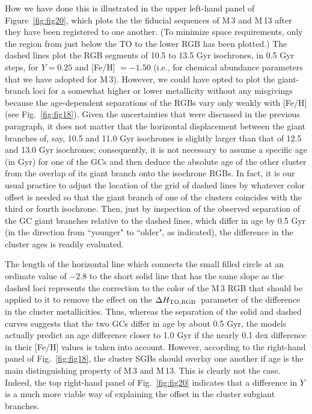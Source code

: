 \documentclass[12pt,preprint]{aastex}
\newcommand\delc{\Delta H_{\rm TO,RGB}}
\begin{document}
How we have done this is illustrated in the upper left-hand panel of
Figure~\ref{fig:fig20}, which plots the the fiducial sequences of M$\,$3 and
M$\,$13 after they have been registered to one another.  (To minimize space
requirements, only the region from just below the TO to the lower RGB has been
plotted.)  The dashed lines plot the RGB segments of 10.5 to 13.5 Gyr 
isochrones, in 0.5 Gyr steps, for $Y = 0.25$ and [Fe/H] $= -1.50$ (i.e., for
chemical abundance parameters that we have adopted for M$\,$3).  However, we
could have opted to plot the giant-branch loci for a somewhat higher or lower
metallicity without any misgivings because the age-dependent separations of the
RGBs vary only weakly with [Fe/H] (see Fig.~\ref{fig:fig18}).  Given the
uncertainties that were discussed in the previous paragraph, it does not matter
that the horizontal displacement between the giant branches of, say, 10.5 and
11.0 Gyr isochrones is slightly larger than that of 12.5 and 13.0 Gyr
isochrones; consequently, it is not necessary to assume a specific age (in Gyr)
for one of the GCs and then deduce the absolute age of the other cluster from
the overlap of its giant branch onto the isochrone RGBs.  In fact, it is our
usual practice to adjust the location of the grid of dashed lines by whatever
color offset is needed so that the giant branch of one of the clusters coincides
with the third or fourth isochrone.  Then, just by inspection of the observed
separation of the GC giant branches relative to the dashed lines, which differ
in age by 0.5 Gyr (in the direction from ``younger" to ``older", as indicated),
the difference in the cluster ages is readily evaluated.

The length of the horizontal line which connects the small filled circle at an
ordinate value of $-2.8$ to the short solid line that has the same slope as the
dashed loci represents the correction to the color of the M$\,$3 RGB that should
be applied to it to remove the effect on the $\delc$\ parameter of the
difference in the cluster metallicities.  Thus, whereas the separation of the
solid and dashed curves suggests that the two GCs differ in age by about 0.5
Gyr, the models actually predict an age difference closer to 1.0 Gyr if the
nearly 0.1 dex difference in their [Fe/H] values is taken into account.
However, according to the right-hand panel of Fig.~\ref{fig:fig18}, the cluster
SGBs should overlay one another if age is the main distinguishing property of
M$\,$3 and M$\,$13.  This is clearly not the case.  Indeed, the top right-hand
panel of Fig.~\ref{fig:fig20} indicates that a difference in $Y$ is a much more
viable way of explaining the offset in the cluster subgiant branches.
\end{document}
